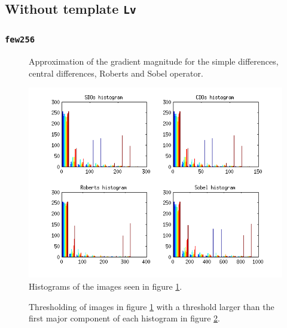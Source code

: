 \subsection{Without template \texttt{Lv}}
\subsubsection{\texttt{few256}}

\begin{figure}[H]
	\centering
	\scalebox{0.7}{}
	\caption{Approximation of the gradient magnitude for the simple differences, central differences, Roberts and Sobel operator.}
	\label{fig:Q2:2_tools}
\end{figure}

\begin{figure}[H]
	\centering
	\includegraphics[scale=0.8]{./images/Q2/tools/histogram_1.png}
	\caption{Histograms of the images seen in figure \ref{fig:Q2:2_tools}.}
	\label{fig:Q2:histogram_tools}
\end{figure}


\begin{figure}[H]
	\centering
	\scalebox{0.9}{}
	\caption{Thresholding of images in figure \ref{fig:Q2:2_tools} with a threshold larger than the first major component of
	each histogram in figure \ref{fig:Q2:histogram_tools}.}
	\label{fig:Q2:threshold_tools_1}
\end{figure}

